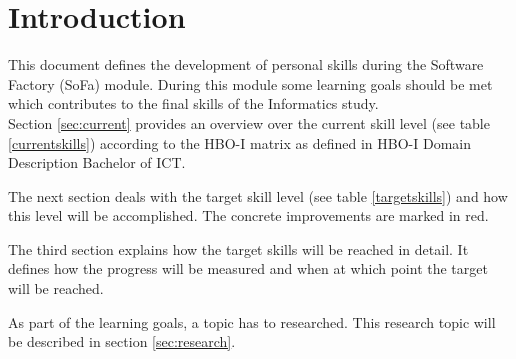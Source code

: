 \section{Introduction}
\label{sec:intro}


This document defines the development of personal skills during the Software Factory (SoFa) module.
During this module some learning goals should be met which contributes to the final skills of the Informatics study.
~\\
Section \ref{sec:current} provides an overview over the current skill level (see table \ref{currentskills}) according to the HBO-I matrix as defined in \glqq HBO-I Domain Description Bachelor of ICT\grqq.

The next section deals with the target skill level (see table \ref{targetskills}) and how this level will be accomplished. The concrete improvements are marked in red.

The third section explains how the target skills will be reached in detail. It defines how the progress will be measured and when at which point the target will be reached.

As part of the learning goals, a topic has to researched. This research topic will be described in section \ref{sec:research}.
